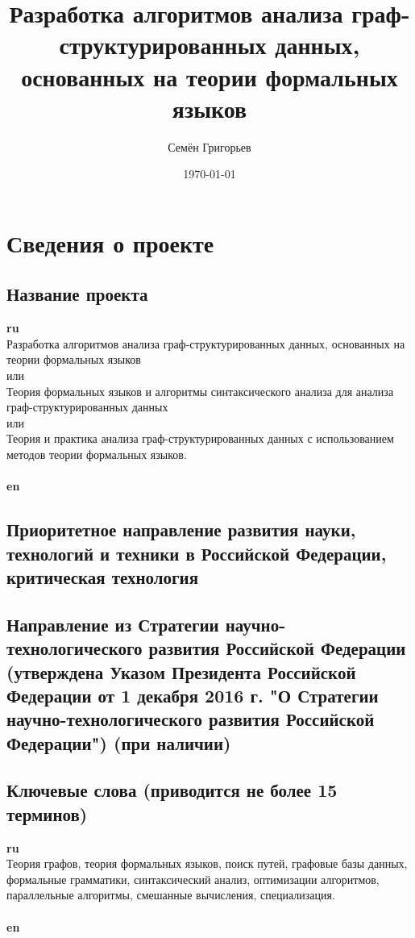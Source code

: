 \documentclass[12pt]{article}  %
\title{Разработка алгоритмов анализа граф-структурированных данных, основанных на теории формальных языков}
\author{Семён Григорьев}
\date{\today}
\theoremstyle{remark}
\begin{document}

\maketitle

\section{Сведения о проекте}

\subsection{Название проекта}

\textbf{ru}\\
%
Разработка алгоритмов анализа граф-структурированных данных, основанных на теории формальных языков
\\
или
\\
Теория формальных языков и алгоритмы синтаксического анализа для анализа граф-структурированных данных
\\
или
\\
Теория и практика анализа граф-структурированных данных с использованием методов теории формальных языков.
\\
\\
\textbf{en}\\


\subsection{Приоритетное направление развития науки, технологий и техники в Российской Федерации, критическая технология}
%


\subsection{Направление из Стратегии научно-технологического развития Российской Федерации (утверждена Указом Президента Российской Федерации от 1 декабря 2016 г.  "О Стратегии научно-технологического развития Российской Федерации") (при наличии)}
%

\subsection{Ключевые слова (приводится не более 15 терминов)}

\textbf{ru}\\
%
Теория графов, теория формальных языков, поиск путей, графовые базы данных, формальные грамматики, синтаксический анализ, оптимизации алгоритмов, параллельные алгоритмы, смешанные вычисления, специализация.
\\
\\
\textbf{en}\\
\end{document}
